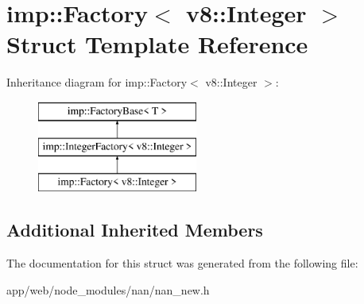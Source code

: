 \hypertarget{structimp_1_1_factory_3_01v8_1_1_integer_01_4}{}\section{imp\+:\+:Factory$<$ v8\+:\+:Integer $>$ Struct Template Reference}
\label{structimp_1_1_factory_3_01v8_1_1_integer_01_4}
Inheritance diagram for imp\+:\+:Factory$<$ v8\+:\+:Integer $>$\+:\begin{figure}[H]
\begin{center}
\leavevmode
\includegraphics[height=3.000000cm]{structimp_1_1_factory_3_01v8_1_1_integer_01_4}
\end{center}
\end{figure}
\subsection*{Additional Inherited Members}


The documentation for this struct was generated from the following file\+:\begin{DoxyCompactItemize}
\item 
app/web/node\+\_\+modules/nan/nan\+\_\+new.\+h\end{DoxyCompactItemize}
